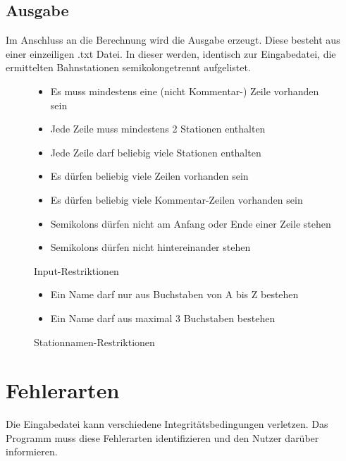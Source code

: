 \subsection{Ausgabe}\label{subsec:ausgabe}
Im Anschluss an die Berechnung wird die Ausgabe erzeugt. Diese besteht aus einer einzeiligen .txt Datei. In dieser werden, identisch zur Eingabedatei, die ermittelten Bahnstationen semikolongetrennt aufgelistet.\\

\begin{figure}[h]
    \centering
    \caption{Input-Restriktionen}
    \begin{itemize}[noitemsep]
        \item Es muss mindestens eine (nicht Kommentar-) Zeile vorhanden sein
        \item Jede Zeile muss mindestens 2 Stationen enthalten
        \item Jede Zeile darf beliebig viele Stationen enthalten
        \item Es dürfen beliebig viele Zeilen vorhanden sein
        \item Es dürfen beliebig viele Kommentar-Zeilen vorhanden sein
        \item Semikolons dürfen nicht am Anfang oder Ende einer Zeile stehen
        \item Semikolons dürfen nicht hintereinander stehen
    \end{itemize}
    \label{fig:input-restrictions}
\end{figure}

\begin{figure}[h]
    \centering
    \caption{Stationnamen-Restriktionen}
    \begin{itemize}[noitemsep]
        \item Ein Name darf nur aus Buchstaben von A bis Z bestehen
        \item Ein Name darf aus maximal 3 Buchstaben bestehen
    \end{itemize}
    \label{fig:stationname-restrictions}
\end{figure}


\section{Fehlerarten}\label{sec:fehlerarten}
Die Eingabedatei kann verschiedene Integritätsbedingungen verletzen.
Das Programm muss diese Fehlerarten identifizieren und den Nutzer darüber informieren.

